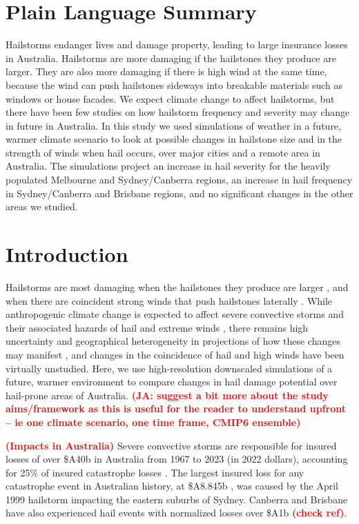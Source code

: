 \documentclass[]{agujournal2019}\usepackage[]{graphicx}\usepackage[]{xcolor}
\newcommand*{\todo}[1]{\textbf{\textcolor{red}{(#1)}}}
\begin{document}
\section*{Plain Language Summary}

Hailstorms endanger lives and damage property, leading to large insurance losses
in Australia. Hailstorms are more damaging if the hailstones they produce are
larger. They are also more damaging if there is high wind at the same time,
because the wind can push hailstones sideways into breakable materials such as
windows or house facades. We expect climate change to affect hailstorms, but
there have been few studies on how hailstorm frequency and severity may change
in future in Australia. In this study we used simulations of weather in a
future, warmer climate scenario to look at possible changes in hailstone size
and in the strength of winds when hail occurs, over major cities and a remote
area in Australia. The simulations project an increase in hail severity for the
heavily populated Melbourne and Sydney/Canberra regions, an increase in hail
frequency in Sydney/Canberra and Brisbane regions, and no significant changes in
the other areas we studied.

\section{Introduction}

Hailstorms are most damaging when the hailstones they produce are larger
\cite{Brimelow_WF_2002, Eccel_IJC_2012}, and when there are coincident strong
winds that push  hailstones laterally \cite{Changnon_JAMC_1967,
Towery_JAMC_1976}. While anthropogenic climate change is expected to affect
severe convective storms \cite{Allen_2018} and their associated hazards of hail
\cite{Raupach_NREE_2021} and extreme winds \cite{Brown_JGRA_2021}, there remains
high uncertainty and geographical heterogeneity in projections of how these
changes may manifest \cite{Raupach_NREE_2021, Brown_JGRA_2021}, and changes in
the coincidence of hail and high winds have been virtually unstudied. Here, we
use high-resolution downscaled simulations of a future, warmer environment to
compare changes in hail damage potential over hail-prone areas of Australia.
\todo{JA: suggest a bit more about the study aims/framework as this is useful
for the reader to understand upfront – ie one climate scenario, one time frame,
CMIP6 ensemble}

\todo{Impacts in Australia} Severe convective storms are responsible for insured
losses of over \$A40b in Australia from 1967 to 2023 (in 2022 dollars),
accounting for 25\% of insured catastrophe losses \cite{ICA_2024}. The largest
insured loss for any catastrophe event in Australian history, at \$A8.845b
\cite<normalized to 2022 dollars, >{ICA_2024}, was caused by the April 1999
hailstorm impacting the eastern suburbs of Sydney. Canberra and Brisbane have
also experienced hail events with normalized losses over \$A1b \cite{ICA_2024}
\todo{check ref}. 
\end{document}
